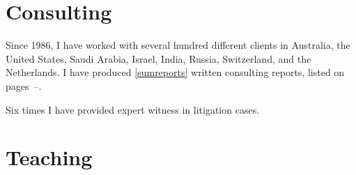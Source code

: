 \documentclass[a4paper,10pt]{article}
\begin{document}
\section{Consulting}

\begin{compactitem}\itemsep=0.1cm
\item Since 1986, I have worked with several hundred different clients in Australia, the United States, Saudi Arabia, Israel, India, Russia, Switzerland, and the Netherlands. I have produced \ref{sumreports} written consulting reports, listed on pages~\pageref{consulting}--\pageref{sumreports}.

\item Six times I have provided expert witness in litigation cases.
\end{compactitem}


\section{Teaching}
\end{document}
